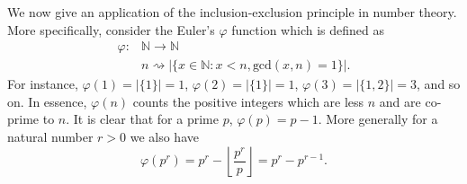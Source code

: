 We now give an application of the inclusion-exclusion principle in number theory. More specifically, consider the Euler's $\varphi$ function which is defined as
\begin{align*}
    \varphi: &\mathbb{N}\to \mathbb{N} \\
    &n\rightsquigarrow |\{x\in\mathbb{N}: x< n, \text{gcd}(x,n)=1\}|.
\end{align*}
For instance, $\varphi(1)=|\{1\}|=1$, $\varphi(2)=|\{1\}|=1$, $\varphi(3)=|\{1,2\}|=3$, and so on. In essence, $\varphi(n)$ counts the positive integers which are less $n$ and are co-prime to $n$. It is clear that for a prime $p$, $\varphi(p) = p-1$. More generally for a natural number $r>0$ we also have
\[
\varphi(p^r) = p^r-\left\lfloor \dfrac{p^r}{p}\right\rfloor = p^r-p^{r-1}.
\]

